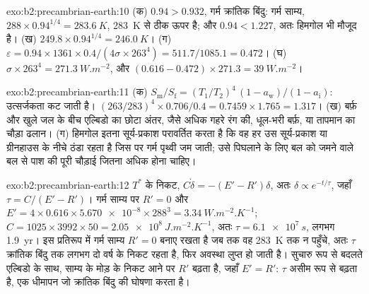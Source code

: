 \begin{solution}{exo:b2:precambrian-earth:10}
(क) $0.94 > 0.932$, गर्म क्रांतिक बिंदु: गर्म साम्य, $288\times0.94^{1/4} =
\qty{283.6}{K}$, \qty{283}{K} से ठीक ऊपर है; और $0.94 < 1.227$, अतः हिमगोल भी मौजूद है।
(ख) $249.8\times0.94^{1/4} = \qty{246.0}{K}$। (ग) $\varepsilon = 0.94\times1361\times0.4/(4\sigma
\times263^4) = 511.7/1085.1 = 0.472$। (घ) $\sigma\times263^4 = \qty{271.3}{W.m^{-2}}$, और $(0.616
- 0.472)\times271.3 = \qty{39}{W.m^{-2}}$।
\end{solution}

\begin{solution}{exo:b2:precambrian-earth:11}
(क) $S_{\text{m}}/S_{\text{f}} = (T_1/T_2)^4\,(1 - a_{\text{w}})/(1 - a_{\text{i}})$:
उत्सर्जकता कट जाती है। $(263/283)^4\times0.706/0.4 = 0.7459\times1.765 = 1.317$। (ख) बर्फ़ और खुले जल के बीच
एल्बिडो का छोटा अंतर, जैसे अधिक गहरे रंग की, धूल-भरी बर्फ़, या तापमान का चौड़ा
ढलान। (ग) हिमगोल इतना सूर्य-प्रकाश परावर्तित करता है कि वह हर उस सूर्य-प्रकाश या
ग्रीनहाउस के नीचे ठंडा रहता है जिस पर गर्म पृथ्वी जम जाती; उसे पिघलाने के लिए बल को
जमने वाले बल से पाश की पूरी चौड़ाई जितना अधिक होना चाहिए।
\end{solution}

\begin{solution}{exo:b2:precambrian-earth:12}
$T^*$ के निकट, $C\dot\delta = -(E' - R')\delta$, अतः $\delta \propto e^{-t/\tau}$, जहाँ $\tau =
C/(E' - R')$। गर्म साम्य पर $R' = 0$ और $E' = 4\times0.616\times\num{5.670e-8}\times
288^3 = \qty{3.34}{W.m^{-2}.K^{-1}}$; $C = 1025\times3992\times50 = \qty{2.05e8}{J.m^{-2}.K^{-1}}$,
अतः $\tau = \qty{6.1e7}{s}$, लगभग \qty{1.9}{yr}। इस प्रतिरूप में गर्म साम्य $R' =
0$ बनाए रखता है जब तक वह \qty{283}{K} तक न पहुँचे, अतः $\tau$ क्रांतिक बिंदु तक लगभग दो वर्ष के निकट रहता है, फिर
अवस्था लुप्त हो जाती है। सुचारु रूप से बदलते एल्बिडो के साथ, साम्य के मोड़ के निकट आने पर $R'$ बढ़ता है,
जहाँ $E' = R'$: $\tau$ असीम रूप से बढ़ता है, एक धीमापन जो क्रांतिक
बिंदु की घोषणा करता है।
\end{solution}

